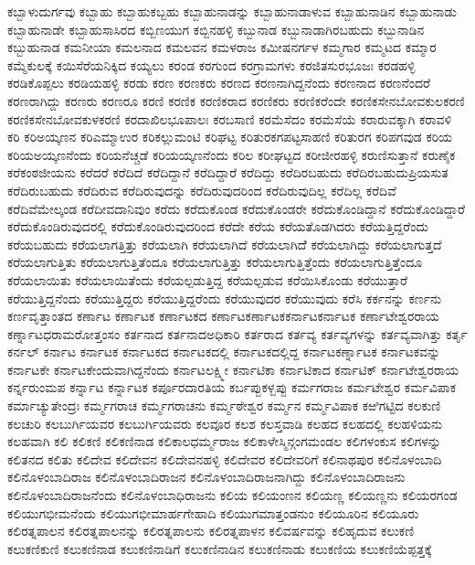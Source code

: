 {ಕಬ್ಬಾಳುದುರ್ಗವು
ಕಬ್ಬಾಹು
ಕಬ್ಬಾಹುಕಬ್ಬಹು
ಕಬ್ಬಾಹುನಾಡನ್ನು
ಕಬ್ಬಾಹುನಾಡಾಳುವ
ಕಬ್ಬಾಹುನಾಡಿನ
ಕಬ್ಬಾಹುನಾಡು
ಕಬ್ಬಾಹುನಾಡೇ
ಕಬ್ಬಾಹುಸಾಸಿರದ
ಕಬ್ಬಿಣಯುಗ
ಕಬ್ಬಿನಹಳ್ಳಿ
ಕಬ್ಬುನಾಡ
ಕಬ್ಬುನಾಡಾಗಿರಬಹುದು
ಕಬ್ಬುನಾಡಿನ
ಕಬ್ಬುಹುನಾಡ
ಕಮನೀಯಾ
ಕಮಲನಾದ
ಕಮಲವನ
ಕಮಳರಾಜ
ಕಮೀಷನರ್ಗಳ
ಕಮ್ಮಗಾರ
ಕಮ್ಮಟದ
ಕಮ್ಮಾರ
ಕಮ್ಮೆಕುಲಕ್ಕೆ
ಕಯಿಸೆರೆಯನಿಕ್ಕಿದ
ಕಯ್ಯಲು
ಕರಂಡ
ಕರಗುಂದ
ಕರಗ್ರಾಮಗಳು
ಕರಜಿತಸುರಭೂಜಃ
ಕರಡಹಳ್ಳಿ
ಕರಡಿಕೊಪ್ಪಲು
ಕರಡಿಯಹಳ್ಳಿ
ಕರಡು
ಕರಣ
ಕರಣಕರು
ಕರಣದ
ಕರಣನಾಗಿದ್ದನೆಂದು
ಕರಣನಾದ
ಕರಣನೆಂದರೆ
ಕರಣರಾಗಿದ್ದು
ಕರಣರು
ಕರಣರೂ
ಕರಣಿ
ಕರಣಿಕ
ಕರಣಿಕರಾದ
ಕರಣಿಕರು
ಕರಣಿಕರೆಂದೇ
ಕರಣಿಕಸೇನಬೋವಕುಲಕರಣಿ
ಕರಣಿಕಸೇನಬೋವಕುಳಕರಣಿ
ಕರದಾಖಿಲಭೂಪಾಲಃ
ಕರಬಸಾಣಿ
ಕರಮೆಸೆದಂ
ಕರಮೆಸೆಯೆ
ಕರಾರುವಕ್ಕಾಗಿ
ಕರಾವಳಿ
ಕರಿ
ಕರಿಅಯ್ಕಣನ
ಕರಿಎಮ್ಮಾಉರ
ಕರಿಕಲ್ಲುಮಂಟಿ
ಕರಿಘಟ್ಟ
ಕರಿತುರಕಗಪಟ್ಟಸಾಹಣಿ
ಕರಿತುರಗ
ಕರಿಪಗವುಡ
ಕರಿಯ
ಕರಿಯಅಯ್ಕಣನೆಂದು
ಕರಿಯನೆಚ್ಚಡೆ
ಕರಿಯಯ್ಕಣನೆಂದು
ಕರಿಲ
ಕರೀಘಟ್ಟದ
ಕರೀಜೀರಹಳ್ಳಿ
ಕರುಣಿಸುತ್ತಾನೆ
ಕರುಣೈಕ
ಕರೆಕಂಠಜೀಯನು
ಕರೆದರೆ
ಕರೆದಿದೆ
ಕರೆದಿದ್ದಾನೆ
ಕರೆದಿದ್ದಾರೆ
ಕರೆದಿದ್ದು
ಕರೆದಿರಬಹುದು
ಕರೆದಿರಬಹುದುಪ್ರಿಯಸುತ
ಕರೆದಿರುಬಹುದು
ಕರೆದಿರುವ
ಕರೆದಿರುವುದನ್ನು
ಕರೆದಿರುವುದರಿಂದ
ಕರೆದಿರುವುದಿಲ್ಲ
ಕರೆದಿಲ್ಲ
ಕರೆದಿವೆ
ಕರೆದಿವೆಮೇಲ್ಕಂಡ
ಕರೆದೀವದಾನಿವುಂ
ಕರೆದು
ಕರೆದುಕೊಂಡ
ಕರೆದುಕೊಂಡರೇ
ಕರೆದುಕೊಂಡಿದ್ದಾನೆ
ಕರೆದುಕೊಂಡಿದ್ದಾರೆ
ಕರೆದುಕೊಂಡಿರುವುದರಲ್ಲಿ
ಕರೆದುಕೊಂಡಿರುವುದರಿಂದ
ಕರೆದೇ
ಕರೆಯ
ಕರೆಯತೊಡಗಿದರು
ಕರೆಯತ್ತಿದ್ದರೆಂದು
ಕರೆಯಬಹುದು
ಕರೆಯಲಾಗತ್ತಿತ್ತು
ಕರೆಯಲಾಗಿ
ಕರೆಯಲಾಗಿದೆ
ಕರೆಯಲಾಗಿದೆೆ
ಕರೆಯಲಾಗಿದ್ದು
ಕರೆಯಲಾಗುತ್ತದೆ
ಕರೆಯಲಾಗುತ್ತಿತು
ಕರೆಯಲಾಗುತ್ತಿತೆಂದೂ
ಕರೆಯಲಾಗುತ್ತಿತ್ತು
ಕರೆಯಲಾಗುತ್ತಿತ್ತೆಂದು
ಕರೆಯಲಾಗುತ್ತಿತ್ತೆಂದೂ
ಕರೆಯಲಾಯಿತು
ಕರೆಯಲಾಯಿತೆಂದು
ಕರೆಯಲ್ಪಡುತ್ತಿದ್ದ
ಕರೆಯಲ್ಪಡುವ
ಕರೆಯಿಸಿಕೊಂಡು
ಕರೆಯುತ್ತಾರೆ
ಕರೆಯುತ್ತಿದ್ದನೆಂದು
ಕರೆಯುತ್ತಿದ್ದರು
ಕರೆಯುತ್ತಿದ್ದರೆಂದು
ಕರೆಯುವುದರ
ಕರೆಯುವುದು
ಕರೆಸಿ
ಕರ್ಕನನ್ನು
ಕರ್ಣನು
ಕರ್ಣವೃತ್ತಾಂತದ
ಕರ್ಣಾಟ
ಕರ್ಣಾಟಕ
ಕರ್ಣಾಟಕದ
ಕರ್ಣಾಟಕರ್ಣಾಟಕಕರ್ನಾಟಕರ್ನಾಟಕ
ಕರ್ಣಾಟೇಶ್ವರರಾಯ
ಕರ್ಣ್ನಾಟಧರಾಮರೋತ್ತಂಸಂ
ಕರ್ತನಾದ
ಕರ್ತನಾದಅಧಿಕಾರಿ
ಕರ್ತರಾದ
ಕರ್ತವ್ಯ
ಕರ್ತವ್ಯಗಳನ್ನು
ಕರ್ತವ್ಯವಾಗಿತ್ತು
ಕರ್ತೃ
ಕರ್ನಲ್
ಕರ್ನಾಟ
ಕರ್ನಾಟಕ
ಕರ್ನಾಟಕದ
ಕರ್ನಾಟಕದಲ್ಲಿ
ಕರ್ನಾಟಕದಲ್ಲಿದ್ದ
ಕರ್ನಾಟಕರ್ಣ್ನಾಟಕ
ಕರ್ನಾಟಕವನ್ನು
ಕರ್ನಾಟಕೇ
ಕರ್ನಾಟಕೇಂದುವಾಗಿದ್ದನೆಂದು
ಕರ್ನಾಟಲಕ್ಷ್ಮೀ
ಕರ್ನಾಟಿಕಾ
ಕರ್ನಾಟಿಕಾದ
ಕರ್ನಾಟಿಕ್
ಕರ್ನಾಟೇಶ್ವರರಾಯ
ಕರ್ನ್ನರುಂಮಪ
ಕರ್ನ್ನಾಟ
ಕರ್ನ್ನಾಟಕ
ಕರ್ಪೂರದಾರತಿಯ
ಕರ್ಬಪ್ಪುಕಳ್ಬಪ್ಪು
ಕರ್ಮಗರಾಜ
ಕರ್ಮಟೇಶ್ವರ
ಕರ್ಮವಿಪಾಕ
ಕರ್ಮಾಚ್ಯುತೇಂದ್ರಃ
ಕರ್ಮ್ಮಗರಾಚ
ಕರ್ಮ್ಮಗರಾಚನು
ಕರ್ಮ್ಮಠೇಶ್ವರ
ಕರ್ಮ್ಮನ
ಕರ್ಮ್ಮವಿಪಾಕ
ಕಱಿಗಟ್ಟಿದ
ಕಲಕುಣಿ
ಕಲಚುರಿ
ಕಲಬುರ್ಗಿಯವರ
ಕಲಬುರ್ಗಿಯವರು
ಕಲವೂರ
ಕಲಶ
ಕಲಸ್ತವಾಡಿ
ಕಲಹದ
ಕಲಹದಲ್ಲಿ
ಕಲಹಳಿಯನು
ಕಲಹವಾಗಿ
ಕಲಿ
ಕಲಿಕಣಿ
ಕಲಿಕಣಿನಾಡ
ಕಲಿಕಾಲಧರ್ಮ್ಮರಾಜ
ಕಲಿಕಾಳೇಸ್ಮಿನ್ಗಂಗಮಂಡಲ
ಕಲಿಗಳಂಕುಸ
ಕಲಿಗಳನ್ನು
ಕಲಿತನದ
ಕಲಿತು
ಕಲಿದೇವ
ಕಲಿದೇವನ
ಕಲಿದೇವನಹಳ್ಳಿ
ಕಲಿದೇವರ
ಕಲಿದೇವರಿಗೆ
ಕಲಿನಾಥಪುರ
ಕಲಿನೊಳಂಬಾದಿ
ಕಲಿನೊಳಂಬಾದಿರಾಜ
ಕಲಿನೊಳಂಬಾದಿರಾಜನ
ಕಲಿನೊಳಂಬಾದಿರಾಜನಾಗಿದ್ದು
ಕಲಿನೊಳಂಬಾದಿರಾಜನು
ಕಲಿನೊಳಂಬಾದಿರಾಜನೆಂದು
ಕಲಿನೊಳಂಬಾಧಿರಾಜನು
ಕಲಿಯ
ಕಲಿಯಂಣನ
ಕಲಿಯಣ್ಣ
ಕಲಿಯಣ್ಣನು
ಕಲಿಯರಗಂಡ
ಕಲಿಯುಗಭೀಮನೆಂದು
ಕಲಿಯುಗಭೀಮಾರ್ಹಗೇಹಾದಿ
ಕಲಿಯುಗಮಾತ್ತಂಡನುಂ
ಕಲಿಯೂರಿನ
ಕಲಿಯೂರು
ಕಲಿರತ್ನಪಾಲನ
ಕಲಿರತ್ನಪಾಲನನ್ನು
ಕಲಿರತ್ನಪಾಲನು
ಕಲಿರತ್ನಪಾಳನ
ಕಲಿವರ್ಷವನ್ನು
ಕಲಿಹೃದುವ
ಕಲುಕಣಿ
ಕಲುಕಣಿಕುಣಿ
ಕಲುಕಣಿನಾಡ
ಕಲುಕಣಿನಾಡಿಗೆ
ಕಲುಕಣಿನಾಡಿನ
ಕಲುಕಣಿನಾಡು
ಕಲುಕಣಿಯ
ಕಲುಕಣಿಯೆಪ್ಪತ್ತಕ್ಕೆ
}
